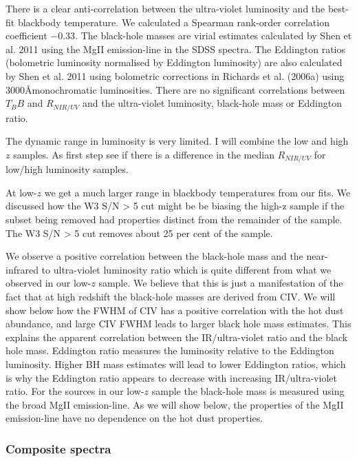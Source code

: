 There is a clear anti-correlation between the ultra-violet luminosity and the best-fit blackbody temperature. 
We calculated a Spearman rank-order correlation coefficient $-0.33$. 
The black-hole masses are virial estimates calculated by Shen et al. 2011 using the MgII emission-line in the SDSS spectra. 
The Eddington ratios (bolometric luminosity normalised by Eddington luminosity) are also calculated by Shen et al. 2011 using bolometric corrections in Richards et al. (2006a) using 3000\AA monochromatic luminosities. 
There are no significant correlations between $T_BB$ and $R_{NIR/UV}$ and the ultra-violet luminosity, black-hole mass or Eddington ratio. 

The dynamic range in luminosity is very limited. 
I will combine the low and high $z$ samples. 
As first step see if there is a difference in the median $R_{NIR/UV}$ for low/high luminosity samples. 

At low-$z$  we get a much larger range in blackbody temperatures from our fits. 
We discussed how the W3 S/N > 5 cut might be be biasing the high-z sample if the subset being removed had properties distinct from the remainder of the sample. 
The W3 S/N > 5 cut removes about 25 per cent of the sample. 

We observe a positive correlation between the black-hole mass and the near-infrared to ultra-violet luminosity ratio which is quite different from what we observed in our low-$z$ sample. 
We believe that this is just a manifestation of the fact that at high redshift the black-hole masses are derived from CIV. 
We will show below how the FWHM of CIV has a positive correlation with the hot dust abundance, and large CIV FWHM leads to larger black hole mass estimates. 
This explains the apparent correlation between the IR/ultra-violet ratio and the black hole mass. 
Eddington ratio measures the luminosity relative to the Eddington luminosity. 
Higher BH mass estimates will lead to lower Eddington ratios, which is why the Eddington ratio appears to decrease with increasing IR/ultra-violet ratio. 
For the sources in our low-$z$ sample the black-hole mass is measured using the broad MgII emission-line. 
As we will show below, the properties of the MgII emission-line have no dependence on the hot dust properties. 


\subsubsection{Composite spectra}

